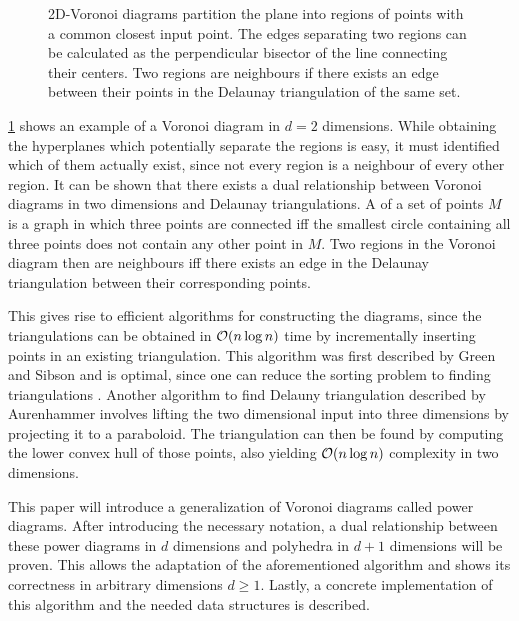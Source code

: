 \begin{figure}[Htb]
    \caption{2D-Voronoi diagrams partition the plane into regions of points with a common closest input point. The edges separating two regions can be calculated as the perpendicular bisector of the line connecting their centers. Two regions are neighbours if there exists an edge between their points in the Delaunay triangulation of the same set.}
    \label{fig:voronoi}
\end{figure}

\cref{fig:voronoi} shows an example of a Voronoi diagram in $d = 2$ dimensions.
While obtaining the hyperplanes which potentially separate the regions is easy, it must identified which of them actually exist, since not every region is a neighbour of every other region.
It can be shown \cite{aurenhammer1991voronoi} that there exists a dual relationship between Voronoi diagrams in two dimensions and Delaunay triangulations.
A  of a set of points $M$ is a graph in which three points are connected iff the smallest circle containing all three points does not contain any other point in $M$.
Two regions in the Voronoi diagram then are neighbours iff there exists an edge in the Delaunay triangulation between their corresponding points.

This gives rise to efficient algorithms for constructing the diagrams, since the triangulations can be obtained in $\mathcal{O}(n \log n)$ time by incrementally inserting points in an existing triangulation.
This algorithm was first described by Green and Sibson \cite{green1978computing} and is optimal, since one can reduce the sorting problem to finding triangulations \cite{aurenhammer1991voronoi}.
Another algorithm to find Delauny triangulation described by Aurenhammer involves lifting the two dimensional input into three dimensions by projecting it to a paraboloid.
The triangulation can then be found by computing the lower convex hull of those points, also yielding $\mathcal{O}(n \log n)$ complexity in two dimensions.

This paper will introduce a generalization of Voronoi diagrams called power diagrams.
After introducing the necessary notation, a dual relationship between these power diagrams in $d$ dimensions and polyhedra in $d+1$ dimensions will be proven.
This allows the adaptation of the aforementioned algorithm and shows its correctness in arbitrary dimensions $d \geq 1$.
Lastly, a concrete implementation of this algorithm and the needed data structures is described.

